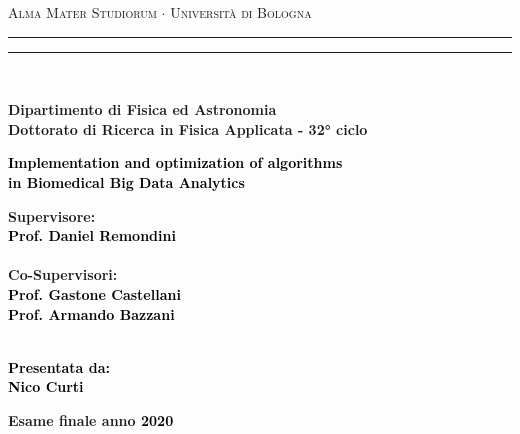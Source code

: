 \documentclass{standalone}
\begin{document}
\begin{titlepage}


\begin{center}
{{\Large{\textsc{Alma Mater Studiorum $\cdot$ Universit\`a di Bologna}}}}
\rule[0.1cm]{15.8cm}{0.1mm}
\rule[0.5cm]{15.8cm}{0.6mm}
\\\vspace{3mm}

{\small{\bf Dipartimento di Fisica ed Astronomia\\Dottorato di Ricerca in Fisica Applicata - 32° ciclo}}

\end{center}

\vspace{23mm}

\begin{center}\textcolor{black}{
{\Large{\bf Implementation and optimization of algorithms\\in Biomedical Big Data Analytics}}\\
}\end{center}

\vspace{70mm} \par \noindent

\begin{minipage}[t]{\textwidth}
{\large{\bf Supervisore: \vspace{2mm}\\\textcolor{black}{
Prof. Daniel Remondini}}}\\\\
{\large{\bf Co-Supervisori: \vspace{2mm}\\\textcolor{black}{
Prof. Gastone Castellani\\
Prof. Armando Bazzani}}}\\\\
\end{minipage}


\hfill

\begin{minipage}[t]{\textwidth}\raggedleft \textcolor{black}{
{\large{\bf Presentata da:
\vspace{2mm}\\
Nico Curti}}}
\end{minipage}

\vspace{17mm}

\begin{center}
{\large{\bf Esame finale anno \textcolor{black}{2020}
}}
\end{center}

\end{titlepage}
\end{document}
